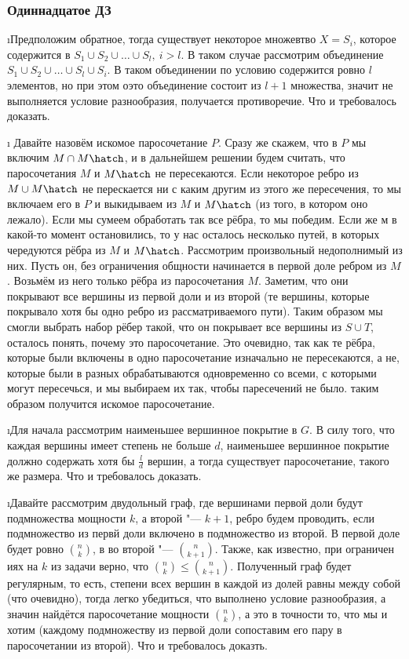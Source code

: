 \subsubsection{Одиннадцатое ДЗ}


\i Предположим обратное, тогда существует некоторое множевтво $X = S_i$, которое содержится в $S_1 \cup S_2 \cup \ldots \cup S_l, \ i > l$. В таком случае рассмотрим объединение $S_1 \cup S_2 \cup \ldots \cup S_l \cup S_i$. В таком объединении по условию содержится ровно $l$ элементов, но при этом оэто объединение состоит из $l+1$ множества, значит не выполняется условие разнообразия, получается противоречие. Что и требовалось доказать.

\i \label{prob.2} Давайте назовём искомое паросочетание $P$. Сразу же скажем, что в $P$ мы включим $M \cap M\hatch$, и в дальнейшем решении будем считать, что паросочетания $M$ и $M\hatch$ не пересекаются. Если некоторое ребро из $M \cup M\hatch$ не перескается ни с каким другим из этого же пересечения, то мы включаем его в $P$ и выкидываем из $M$ и $M\hatch$ (из того, в котором оно лежало). Если мы сумеем обработать так все рёбра, то мы победим. Если же м в какой-то момент остановились, то у нас осталось несколько путей, в которых чередуются рёбра из $M$ и $M\hatch$. Рассмотрим произвольный недополнимый из них. Пусть он, без ограничения общности начинается в первой доле ребром из $M$. Возьмём из него только рёбра из паросочетания $M$. Заметим, что они покрывают все вершины из первой доли и из второй (те вершины, которые покрывало хотя бы одно ребро из рассматриваемого пути). Таким образом мы смогли выбрать набор рёбер такой, что он покрывает все вершины из $S \cup T$, осталось понять, почему это паросочетание. Это очевидно, так как те рёбра, которые были включены в одно паросочетание изначально не пересекаются, а не, которые были в разных обрабатываются одновременно со всеми, с которыми могут пересечься, и мы выбираем их так, чтобы паресечений не было. таким образом получится искомое паросочетание.

\i Для начала рассмотрим наименьшее вершинное покрытие в $G$. В силу того, что каждая вершины имеет степень не больше $d$, наименьшее вершинное покрытие должно содержать хотя бы $\frac{l}{d}$ вершин, а тогда существует паросочетание, такого же размера. Что и требовалось доказать.

\i Давайте рассмотрим двудольный граф, где вершинами первой доли будут подмножества мощности $k$, а второй "--- $k+1$, ребро будем проводить, если подмножество из первй доли включено в подмножество из второй. В первой доле будет ровно $\binom{n}{k}$, в во второй "--- $\binom{n}{k+1}$. Также, как известно, при ограничен иях на $k$ из задачи верно, что $\binom{n}{k} \leq \binom{n}{k+1}$. Полученный граф будет регулярным, то есть, степени всех вершин в каждой из долей равны между собой (что очевидно), тогда легко убедиться, что выполнено условие разнообразия, а значин найдётся паросочетание мощности $\binom{n}{k}$, а это в точности то, что мы и хотим (каждому подмножеству из первой доли сопоставим его пару в паросочетании из второй). Что и требовалось доказть.

